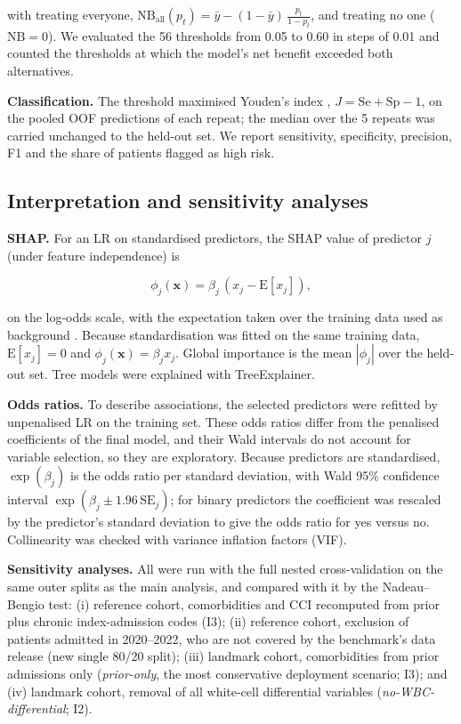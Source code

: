 with treating everyone,
\(\text{NB}_{\text{all}}(p_t) = \bar y - (1 - \bar y)\,\frac{p_t}{1 - p_t}\),
and treating no one (\(\text{NB} = 0\)). We evaluated the 56 thresholds from
0.05 to 0.60 in steps of 0.01 and counted the thresholds at which the model's
net benefit exceeded both alternatives.

\textbf{Classification.} The threshold maximised Youden's index
\parencite{youden1950}, \(J = \text{Se} + \text{Sp} - 1\), on the pooled OOF
predictions of each repeat; the median over the 5 repeats was carried unchanged
to the held-out set. We report sensitivity, specificity, precision, F1 and the
share of patients flagged as high risk.

\hypertarget{interpretation-and-sensitivity-analyses}{%
\subsection{Interpretation and sensitivity
analyses}\label{interpretation-and-sensitivity-analyses}}

\textbf{SHAP.} For an LR on standardised predictors, the SHAP value of predictor
\(j\) (under feature independence) is

\[\phi_j(\mathbf{x}) = \beta_j\,(x_j - \mathrm{E}[x_j]),\]

on the log-odds scale, with the expectation taken over the training data used as
background \parencite{lundberg2017}. Because standardisation was fitted on the
same training data, \(\mathrm{E}[x_j] = 0\) and
\(\phi_j(\mathbf{x}) = \beta_j x_j\). Global importance is the mean \(|\phi_j|\)
over the held-out set. Tree models were explained with TreeExplainer.

\textbf{Odds ratios.} To describe associations, the selected predictors were
refitted by unpenalised LR on the training set. These odds ratios differ from
the penalised coefficients of the final model, and their Wald intervals do not
account for variable selection, so they are exploratory. Because predictors are
standardised, \(\exp(\beta_j)\) is the odds ratio per standard deviation, with
Wald 95\% confidence interval \(\exp(\beta_j \pm 1.96\,\mathrm{SE}_j)\); for
binary predictors the coefficient was rescaled by the predictor's standard
deviation to give the odds ratio for yes versus no. Collinearity was checked
with variance inflation factors (VIF).

\textbf{Sensitivity analyses.} All were run with the full nested
cross-validation on the same outer splits as the main analysis, and compared
with it by the Nadeau--Bengio test: (i) reference cohort, comorbidities and CCI
recomputed from prior plus chronic index-admission codes (I3); (ii) reference
cohort, exclusion of patients admitted in 2020--2022, who are not covered by the
benchmark's data release (new single 80/20 split); (iii) landmark cohort,
comorbidities from prior admissions only (\emph{prior-only}, the most
conservative deployment scenario; I3); and (iv) landmark cohort, removal of all
white-cell differential variables (\emph{no-WBC-differential}; I2).

